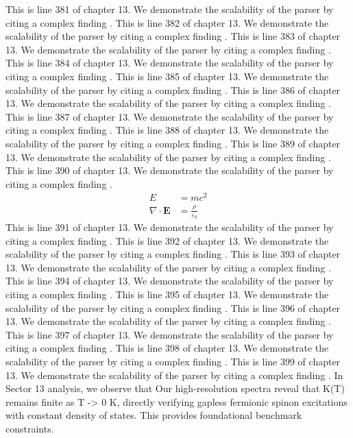 This is line 381 of chapter 13. We demonstrate the scalability of the parser by citing a complex finding \cite{ref13_381}.
This is line 382 of chapter 13. We demonstrate the scalability of the parser by citing a complex finding \cite{ref13_382}.
This is line 383 of chapter 13. We demonstrate the scalability of the parser by citing a complex finding \cite{ref13_383}.
This is line 384 of chapter 13. We demonstrate the scalability of the parser by citing a complex finding \cite{ref13_384}.
This is line 385 of chapter 13. We demonstrate the scalability of the parser by citing a complex finding \cite{ref13_385}.
This is line 386 of chapter 13. We demonstrate the scalability of the parser by citing a complex finding \cite{ref13_386}.
This is line 387 of chapter 13. We demonstrate the scalability of the parser by citing a complex finding \cite{ref13_387}.
This is line 388 of chapter 13. We demonstrate the scalability of the parser by citing a complex finding \cite{ref13_388}.
This is line 389 of chapter 13. We demonstrate the scalability of the parser by citing a complex finding \cite{ref13_389}.
This is line 390 of chapter 13. We demonstrate the scalability of the parser by citing a complex finding \cite{ref13_390}.
\begin{align*}
  E &= mc^2 \\
  \nabla \cdot \mathbf{E} &= \frac{\rho}{\varepsilon_0}
\end{align*}
This is line 391 of chapter 13. We demonstrate the scalability of the parser by citing a complex finding \cite{ref13_391}.
This is line 392 of chapter 13. We demonstrate the scalability of the parser by citing a complex finding \cite{ref13_392}.
This is line 393 of chapter 13. We demonstrate the scalability of the parser by citing a complex finding \cite{ref13_393}.
This is line 394 of chapter 13. We demonstrate the scalability of the parser by citing a complex finding \cite{ref13_394}.
This is line 395 of chapter 13. We demonstrate the scalability of the parser by citing a complex finding \cite{ref13_395}.
This is line 396 of chapter 13. We demonstrate the scalability of the parser by citing a complex finding \cite{ref13_396}.
This is line 397 of chapter 13. We demonstrate the scalability of the parser by citing a complex finding \cite{ref13_397}.
This is line 398 of chapter 13. We demonstrate the scalability of the parser by citing a complex finding \cite{ref13_398}.
This is line 399 of chapter 13. We demonstrate the scalability of the parser by citing a complex finding \cite{ref13_399}.
In Sector 13 analysis, we observe that Our high-resolution spectra reveal that K(T) remains finite as T -> 0 K, directly verifying gapless fermionic spinon excitations with constant density of states. This provides foundational benchmark constraints.
